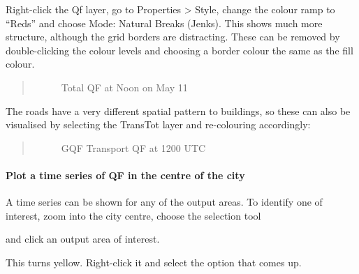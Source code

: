 \documentclass[letterpaper,10pt,english]{sphinxmanual}
\begin{document}
Right-click the Qf layer, go to Properties \textgreater{} Style, change the colour
ramp to “Reds” and choose Mode: Natural Breaks (Jenks). This shows much
more structure, although the grid borders are distracting. These can be
removed by double-clicking the colour levels and choosing a border
colour the same as the fill colour.
\begin{quote}

\begin{figure}[htbp]
\centering
\capstart

\noindent{}
\caption{Total QF at Noon on May 11}\label{\detokenize{Tutorials/GQF:id4}}\end{figure}
\end{quote}

The roads have a very different spatial pattern to buildings, so these
can also be visualised by selecting the TransTot layer and re-colouring
accordingly:
\begin{quote}

\begin{figure}[htbp]
\centering
\capstart

\noindent{}
\caption{GQF Transport QF at 1200 UTC}\label{\detokenize{Tutorials/GQF:id5}}\end{figure}
\end{quote}


\paragraph{Plot a time series of QF in the centre of the city}
\label{\detokenize{Tutorials/GQF:plot-a-time-series-of-qf-in-the-centre-of-the-city}}
A time series can be shown for any of the output areas. To identify one
of interest, zoom into the city centre, choose the selection tool
\begin{quote}

\begin{figure}[htbp]
\centering
\capstart

\noindent{}
\caption{}\label{\detokenize{Tutorials/GQF:id6}}\end{figure}
\end{quote}

and click an output area of
interest.
\begin{description}
\item[{This turns yellow. Right-click it and select the option that comes up.}] \leavevmode
\begin{figure}[htbp]
\centering
\capstart

\noindent{}
\caption{}\label{\detokenize{Tutorials/GQF:id7}}\end{figure}

\end{description}
\end{document}
